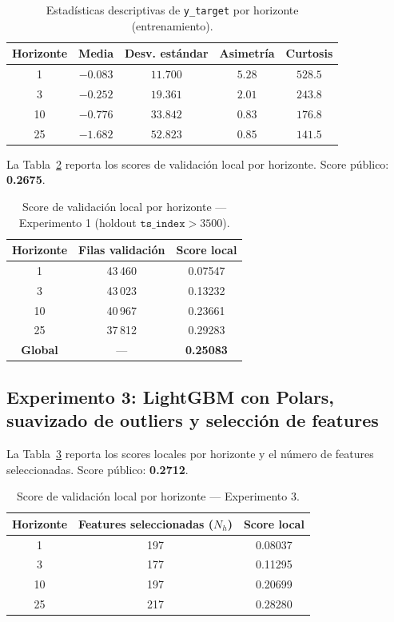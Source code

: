 \documentclass{article}
\begin{document}
\begin{table}[h!]
  \caption{Estadísticas descriptivas de \texttt{y\_target} por horizonte (entrenamiento).}
  \label{tab:target_stats}
  \centering
  \begin{tabular}{ccccc}
    \toprule
    Horizonte & Media & Desv. estándar & Asimetría & Curtosis \\
    \midrule
    1  & $-0.083$ & $11.700$ & $ 5.28$ & $528.5$ \\
    3  & $-0.252$ & $19.361$ & $ 2.01$ & $243.8$ \\
    10 & $-0.776$ & $33.842$ & $ 0.83$ & $176.8$ \\
    25 & $-1.682$ & $52.823$ & $ 0.85$ & $141.5$ \\
    \bottomrule
  \end{tabular}
\end{table}

La Tabla~\ref{tab:horizon_scores} reporta los scores de validación local por horizonte. Score público: \textbf{0.2675}.

\begin{table}[h!]
  \caption{Score de validación local por horizonte — Experimento 1 (holdout $\texttt{ts\_index} > 3500$).}
  \label{tab:horizon_scores}
  \centering
  \begin{tabular}{ccc}
    \toprule
    Horizonte & Filas validación & Score local \\
    \midrule
    1  & 43\,460 & 0.07547 \\
    3  & 43\,023 & 0.13232 \\
    10 & 40\,967 & 0.23661 \\
    25 & 37\,812 & 0.29283 \\
    \midrule
    \textbf{Global} & --- & \textbf{0.25083} \\
    \bottomrule
  \end{tabular}
\end{table}

\subsection{Experimento 3: LightGBM con Polars, suavizado de outliers y selección de features}

La Tabla~\ref{tab:horizon_scores_exp3} reporta los scores locales por horizonte y el número de features seleccionadas. Score público: \textbf{0.2712}.

\begin{table}[h!]
  \caption{Score de validación local por horizonte — Experimento 3.}
  \label{tab:horizon_scores_exp3}
  \centering
  \begin{tabular}{ccc}
    \toprule
    Horizonte & Features seleccionadas ($N_h$) & Score local \\
    \midrule
    1  & 197 & 0.08037 \\
    3  & 177 & 0.11295 \\
    10 & 197 & 0.20699 \\
    25 & 217 & 0.28280 \\
    \bottomrule
  \end{tabular}
\end{table}
\end{document}

